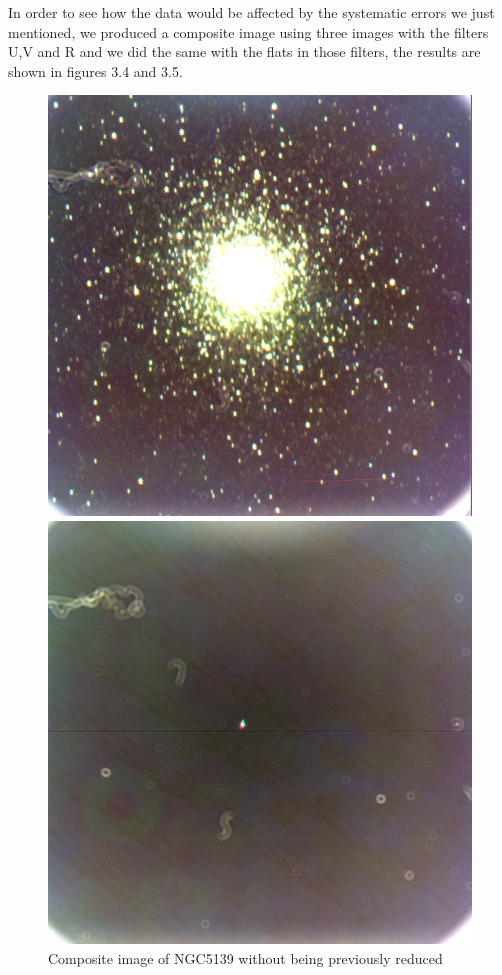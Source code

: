 In order to see how the data would be affected by the systematic errors we just mentioned, we produced a composite image using three images with the filters U,V and R and we did the same with the flats in those filters, the results are shown in figures 3.4 and 3.5.
  
\begin{figure}[H]
  \centering
  \begin{minipage}[b]{0.47\textwidth}
    \includegraphics[width=\textwidth]{images/ngc_5139_dirty.png}
    \caption[Dirty image of NGC5139]{Composite image of NGC5139 without being previously reduced}
  \end{minipage}
  \hfill
  \begin{minipage}[b]{0.47\textwidth}
    \includegraphics[width=\textwidth]{images/ruido.png}

\end{minipage}
\end{figure}
